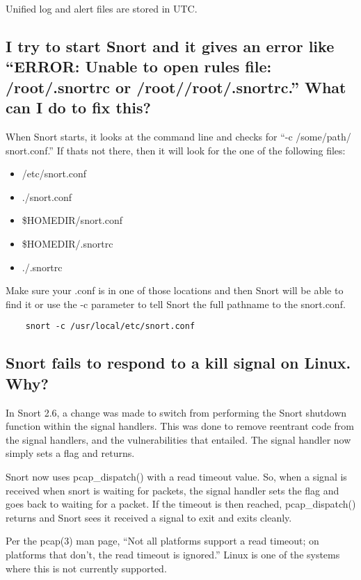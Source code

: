\documentclass{article}
\begin{document}
Unified log and alert files are stored in UTC.

\subsection{I try to start Snort and it gives an error like ``ERROR: Unable to open
rules file: /root/.snortrc or /root//root/.snortrc.'' What can I do to fix this?}

When Snort starts, it looks at the command line and checks for ``-c /some/path/
snort.conf.'' If thats not there, then it will look for the one of the following
files:

\begin{itemize}
  \item /etc/snort.conf
  \item ./snort.conf
  \item \$HOMEDIR/snort.conf
  \item \$HOMEDIR/.snortrc
  \item ./.snortrc
\end{itemize}

Make sure your .conf is in one of those locations and then Snort will be able
to find it or use the -c parameter to tell Snort the full pathname to the
snort.conf.
\begin{verbatim}
    snort -c /usr/local/etc/snort.conf
\end{verbatim}

\subsection{Snort fails to respond to a kill signal on Linux.  Why?}

In Snort 2.6, a change was made to switch from performing the Snort
shutdown function within the signal handlers.  This was done to remove
reentrant code from the signal handlers, and the vulnerabilities that
entailed.  The signal handler now simply sets a flag and returns.

Snort now uses pcap\_dispatch() with a read timeout value.  So, when a
signal is received when snort is waiting for packets, the signal handler
sets the flag and goes back to waiting for a packet.  If the timeout
is then reached, pcap\_dispatch() returns and Snort sees it received a
signal to exit and exits cleanly.

Per the pcap(3) man page, ``Not all platforms support a read timeout;
on platforms that don't, the read timeout is ignored.''  Linux is one
of the systems where this is not currently supported.
\end{document}
